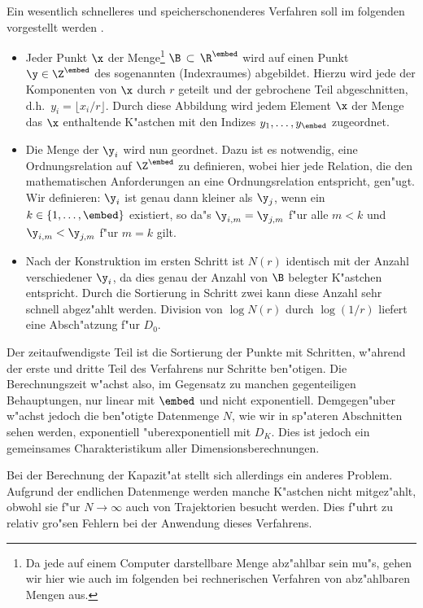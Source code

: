 Ein wesentlich schnelleres und speicherschonenderes Verfahren soll im folgenden
vorgestellt werden \cite{Junglas}.
\begin{itemize}
\item Jeder Punkt $\x$ der Menge\footnote{Da jede auf einem
Computer darstellbare Menge abz"ahlbar sein mu"s, gehen wir hier wie auch im folgenden bei 
rechnerischen Verfahren von abz"ahlbaren Mengen aus.} $\B\,\subset\,\R^\embed$ wird auf einen
Punkt $\y\in\Z^\embed$ des sogenannten \begriff(Indexraumes)  abgebildet. Hierzu wird jede
der Komponenten von $\x$ durch $r$ geteilt und der gebrochene Teil abgeschnitten,
d.h.\  $y_i=\lfloor x_i/r \rfloor$. Durch diese Abbildung wird jedem Element $\x$ der
Menge das $\x$ enthaltende K"astchen mit den Indizes $y_1,\dots,y_\embed$ zugeordnet.
\item Die Menge der $\y_i$ wird nun geordnet. Dazu ist es notwendig, eine Ordnungsrelation
auf $\Z^\embed$ zu definieren, wobei hier jede Relation, die den 
mathematischen Anforderungen an eine Ordnungsrelation entspricht, gen"ugt. 
Wir definieren: $\y_i$
ist genau dann kleiner als $\y_j$, wenn ein $k\in\{1,\dots,\embed\}$ existiert, so da"s
$\y_{i,m}=\y_{j,m}$ f"ur alle $m<k$ und $\y_{i,m}<\y_{j,m}$ f"ur $m=k$ gilt. 
\item Nach der Konstruktion im ersten Schritt ist $N(r)$ identisch mit der Anzahl
verschiedener $\y_i$, da dies genau der Anzahl von $\B$ belegter K"astchen
entspricht. Durch die Sortierung in Schritt zwei kann diese Anzahl sehr schnell abgez"ahlt 
werden. Division von $\log N(r)$ durch $\log(1/r)$ liefert eine Absch"atzung f"ur $D_0$.
\end{itemize}
Der zeitaufwendigste Teil ist die Sortierung der Punkte mit  Schritten,
w"ahrend der erste und dritte Teil des Verfahrens nur  Schritte ben"otigen. 
Die Berechnungszeit w"achst also, im Gegensatz zu manchen gegenteiligen Behauptungen,
nur linear mit $\embed$ und nicht exponentiell. Demgegen"uber w"achst jedoch die
ben"otigte Datenmenge $N$, wie wir in sp"ateren Abschnitten sehen werden, exponentiell
"uberexponentiell mit $D_K$. Dies ist jedoch ein gemeinsames Charakteristikum
aller Dimensionsberechnungen.

Bei der Berechnung der Kapazit"at stellt sich allerdings ein anderes Problem. Aufgrund der
endlichen Datenmenge werden manche K"astchen nicht mitgez"ahlt, obwohl sie f"ur
$N\to\infty$ auch von Trajektorien besucht werden. Dies f"uhrt zu relativ gro"sen Fehlern 
bei der Anwendung dieses Verfahrens. 

